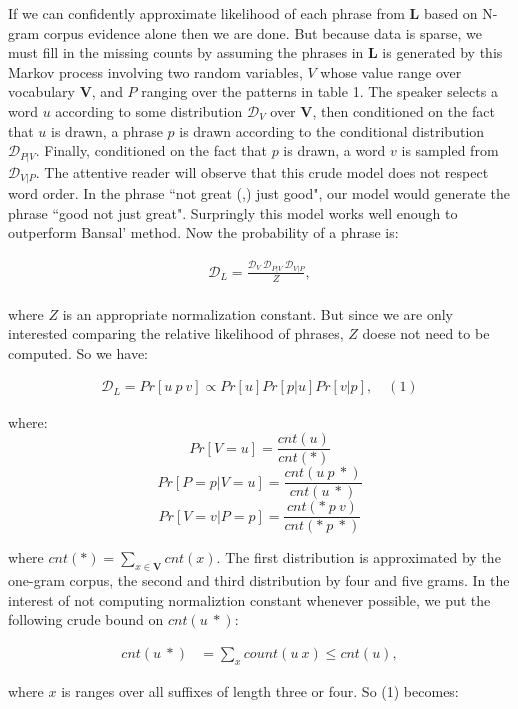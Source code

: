 If we can confidently approximate likelihood of each phrase from $\mathbf{L}$ based on N-gram corpus evidence alone then we are done. But because data is sparse, we must fill in the missing counts by assuming the phrases in $\mathbf{L}$ is generated by this Markov process involving two random variables, $V$ whose value range over vocabulary $\mathbf{V}$, and $P$ ranging over the patterns in table 1. The speaker selects a word $u$ according to some distribution $\mathcal{D}_{V}$ over $\mathbf{V}$,  then conditioned on the fact that $u$ is drawn, a phrase $p$ is drawn according to the conditional distribution $\mathcal{D}_{P|V}$. Finally, conditioned on the fact that $p$ is drawn, a word $v$ is sampled from $\mathcal{D}_{V|P}$. The attentive reader will observe that this crude model does not respect word order. In the phrase ``not great (,) just good", our model would generate the phrase ``good not just great". Surpringly this model works well enough to outperform Bansal' method. Now the probability of a phrase is:

\begin{align*}
\mathcal{D}_L = \frac{\mathcal{D}_{V} \: \mathcal{D}_{P|V} \: \mathcal{D}_{V|P}}{Z},\\
\end{align*}

where $Z$ is an appropriate normalization constant. But since we are only interested comparing the relative likelihood of phrases, $Z$ doese not need to be computed. So we have:

\begin{align*}
\mathcal{D}_L = Pr[u \: p \: v] \propto Pr[u] Pr[p | u] Pr[v | p], \quad (1)
\end{align*}

where:
\[Pr[V = u]               = \frac{cnt(u)}{cnt(*)}\]
\[Pr[P = p | V = u]  = \frac{cnt(u \: p \: *)}{cnt(u \: *)}\]
\[Pr[V = v | P = p]  = \frac{cnt(* \: p \: v)}{cnt(* \: p \: *)}\]

where $cnt(*) = \sum_{x \in \mathbf{V}} cnt(x)$. The first distribution is approximated by the one-gram corpus, the second and third distribution by four and five grams. In the interest of not computing normaliztion constant whenever possible, we put the following crude bound on $cnt(u \: *)$:

\begin{align*}
cnt(u \: *) &= \sum_{x} count(u \: x) \leq cnt(u),
\end{align*}

where $x$ is ranges over all suffixes of length three or four. So (1) becomes:\\

